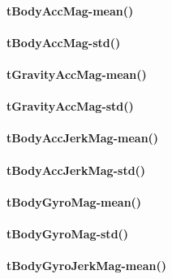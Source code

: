 \documentclass[
]{article}
\begin{document}
\hypertarget{tbodyaccmag-mean}{%
\paragraph{tBodyAccMag-mean()}\label{tbodyaccmag-mean}}

\hypertarget{tbodyaccmag-std}{%
\paragraph{tBodyAccMag-std()}\label{tbodyaccmag-std}}

\hypertarget{tgravityaccmag-mean}{%
\paragraph{tGravityAccMag-mean()}\label{tgravityaccmag-mean}}

\hypertarget{tgravityaccmag-std}{%
\paragraph{tGravityAccMag-std()}\label{tgravityaccmag-std}}

\hypertarget{tbodyaccjerkmag-mean}{%
\paragraph{tBodyAccJerkMag-mean()}\label{tbodyaccjerkmag-mean}}

\hypertarget{tbodyaccjerkmag-std}{%
\paragraph{tBodyAccJerkMag-std()}\label{tbodyaccjerkmag-std}}

\hypertarget{tbodygyromag-mean}{%
\paragraph{tBodyGyroMag-mean()}\label{tbodygyromag-mean}}

\hypertarget{tbodygyromag-std}{%
\paragraph{tBodyGyroMag-std()}\label{tbodygyromag-std}}

\hypertarget{tbodygyrojerkmag-mean}{%
\paragraph{tBodyGyroJerkMag-mean()}\label{tbodygyrojerkmag-mean}}
\end{document}
